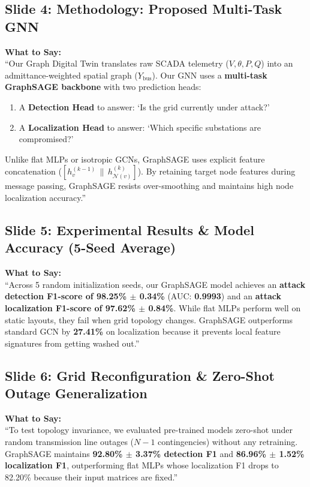 \documentclass[11pt,a4paper]{article}
\begin{document}
\subsection{Slide 4: Methodology: Proposed Multi-Task GNN}
\begin{mdframed}[style=saystyle]
\textbf{What to Say:}\\
``Our Graph Digital Twin translates raw SCADA telemetry ($V, \theta, P, Q$) into an admittance-weighted spatial graph ($Y_{\text{bus}}$). Our GNN uses a \textbf{multi-task GraphSAGE backbone} with two prediction heads:
\begin{enumerate}
    \item A \textbf{Detection Head} to answer: `Is the grid currently under attack?'
    \item A \textbf{Localization Head} to answer: `Which specific substations are compromised?'
\end{enumerate}
Unlike flat MLPs or isotropic GCNs, GraphSAGE uses explicit feature concatenation ($[h_v^{(k-1)} \,\|\, h_{\mathcal{N}(v)}^{(k)}]$). By retaining target node features during message passing, GraphSAGE resists over-smoothing and maintains high node localization accuracy.''
\end{mdframed}

\subsection{Slide 5: Experimental Results \& Model Accuracy (5-Seed Average)}
\begin{mdframed}[style=saystyle]
\textbf{What to Say:}\\
``Across 5 random initialization seeds, our GraphSAGE model achieves an \textbf{attack detection F1-score of 98.25\% $\pm$ 0.34\%} (AUC: \textbf{0.9993}) and an \textbf{attack localization F1-score of 97.62\% $\pm$ 0.84\%}. While flat MLPs perform well on static layouts, they fail when grid topology changes. GraphSAGE outperforms standard GCN by \textbf{27.41\%} on localization because it prevents local feature signatures from getting washed out.''
\end{mdframed}

\subsection{Slide 6: Grid Reconfiguration \& Zero-Shot Outage Generalization}
\begin{mdframed}[style=saystyle]
\textbf{What to Say:}\\
``To test topology invariance, we evaluated pre-trained models zero-shot under random transmission line outages ($N-1$ contingencies) without any retraining. GraphSAGE maintains \textbf{92.80\% $\pm$ 3.37\% detection F1} and \textbf{86.96\% $\pm$ 1.52\% localization F1}, outperforming flat MLPs whose localization F1 drops to 82.20\% because their input matrices are fixed.''
\end{mdframed}
\end{document}
